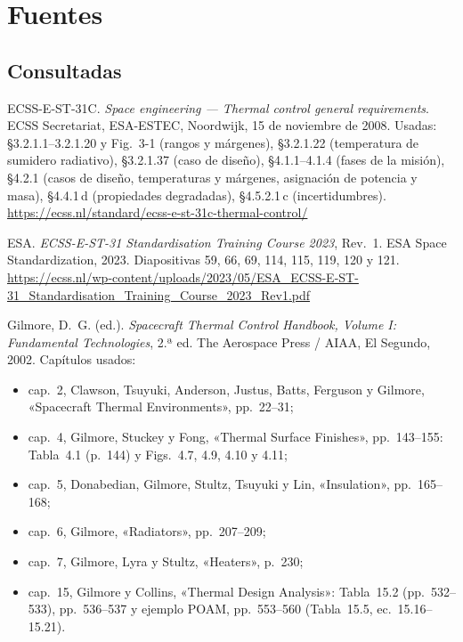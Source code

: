\documentclass[11pt,a4paper]{article}
\begin{document}
\section*{Fuentes}\label{sec:fuentes}

\subsection*{Consultadas}

{\small
\begin{enumerate}[label={[\arabic*]},ref=\arabic*,leftmargin=*]
  \item\label{f:1} ECSS-E-ST-31C. \textit{Space engineering — Thermal control general requirements}. ECSS Secretariat, ESA-ESTEC, Noordwijk, 15 de noviembre de 2008. Usadas: §3.2.1.1--3.2.1.20 y Fig.~3-1 (rangos y márgenes), §3.2.1.22 (temperatura de sumidero radiativo), §3.2.1.37 (caso de diseño), §4.1.1--4.1.4 (fases de la misión), §4.2.1 (casos de diseño, temperaturas y márgenes, asignación de potencia y masa), §4.4.1\,d (propiedades degradadas), §4.5.2.1\,c (incertidumbres). \url{https://ecss.nl/standard/ecss-e-st-31c-thermal-control/}
  \item\label{f:2} ESA. \textit{ECSS-E-ST-31 Standardisation Training Course 2023}, Rev.~1. ESA Space Standardization, 2023. Diapositivas 59, 66, 69, 114, 115, 119, 120 y 121. \url{https://ecss.nl/wp-content/uploads/2023/05/ESA_ECSS-E-ST-31_Standardisation_Training_Course_2023_Rev1.pdf}
  \item\label{f:3} Gilmore, D.~G. (ed.). \textit{Spacecraft Thermal Control Handbook, Volume I: Fundamental Technologies}, 2.ª ed. The Aerospace Press / AIAA, El Segundo, 2002. Capítulos usados:
  \begin{itemize}
    \item cap.~2, Clawson, Tsuyuki, Anderson, Justus, Batts, Ferguson y Gilmore, «Spacecraft Thermal Environments», pp.~22--31;
    \item cap.~4, Gilmore, Stuckey y Fong, «Thermal Surface Finishes», pp.~143--155: Tabla~4.1 (p.~144) y Figs.~4.7, 4.9, 4.10 y 4.11;
    \item cap.~5, Donabedian, Gilmore, Stultz, Tsuyuki y Lin, «Insulation», pp.~165--168;
    \item cap.~6, Gilmore, «Radiators», pp.~207--209;
    \item cap.~7, Gilmore, Lyra y Stultz, «Heaters», p.~230;
    \item cap.~15, Gilmore y Collins, «Thermal Design Analysis»: Tabla~15.2 (pp.~532--533), pp.~536--537 y ejemplo POAM, pp.~553--560 (Tabla~15.5, ec.~15.16--15.21).

\end{itemize}
\end{enumerate}}
\end{document}
